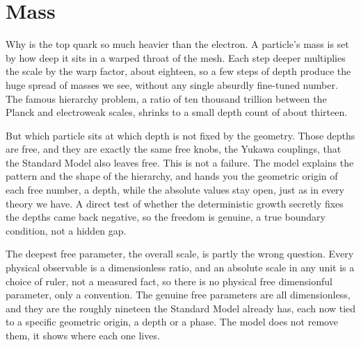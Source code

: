 \section{Mass}

Why is the top quark so much heavier than the electron. A particle's mass is set by how deep it sits in a warped
throat of the mesh. Each step deeper multiplies the scale by the warp factor, about eighteen, so a few steps of
depth produce the huge spread of masses we see, without any single absurdly fine-tuned number. The famous hierarchy
problem, a ratio of ten thousand trillion between the Planck and electroweak scales, shrinks to a small depth count of
about thirteen.

But which particle sits at which depth is not fixed by the geometry. Those depths are free, and they are exactly the
same free knobs, the Yukawa couplings, that the Standard Model also leaves free. This is not a failure. The model
explains the pattern and the shape of the hierarchy, and hands you the geometric origin of each free number, a depth,
while the absolute values stay open, just as in every theory we have. A direct test of whether the deterministic growth
secretly fixes the depths came back negative, so the freedom is genuine, a true boundary condition, not a hidden gap.

The deepest free parameter, the overall scale, is partly the wrong question. Every physical observable is a
dimensionless ratio, and an absolute scale in any unit is a choice of ruler, not a measured fact, so there is no
physical free dimensionful parameter, only a convention. The genuine free parameters are all dimensionless, and they
are the roughly nineteen the Standard Model already has, each now tied to a specific geometric origin, a depth or a
phase. The model does not remove them, it shows where each one lives.
